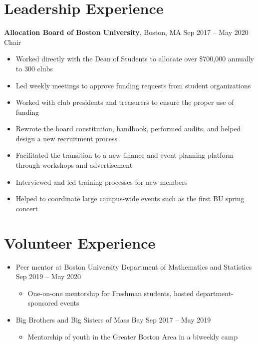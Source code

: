 \documentclass[11pt,letterpaper]{article}
\begin{document}
\section*{Leadership Experience}

\textbf{Allocation Board of Boston University}, Boston, MA \hfill Sep 2017 -- May 2020\\
Chair

\begin{itemize}
\item Worked directly with the Dean of Students to allocate over \$700,000 annually to 300 clubs
\item Led weekly meetings to approve funding requests from student organizations
\item Worked with club presidents and treasurers to ensure the proper use of funding
\item Rewrote the board constitution, handbook, performed audits, and helped design a new recruitment process
\item Facilitated the transition to a new finance and event planning platform through workshops and advertisement
\item Interviewed and led training processes for new members
\item Helped to coordinate large campus-wide events such as the first BU spring concert
\end{itemize}

\section*{Volunteer Experience}

\begin{itemize}
\item Peer mentor at Boston University Department of Mathematics and Statistics \hfill Sep 2019 -- May 2020
    \begin{itemize}
    \item One-on-one mentorship for Freshman students, hosted department-sponsored events
    \end{itemize}

\item Big Brothers and Big Sisters of Mass Bay \hfill Sep 2017 -- May 2019
    \begin{itemize}
    \item Mentorship of youth in the Greater Boston Area in a biweekly camp
    \end{itemize}
\end{itemize}
\end{document}
